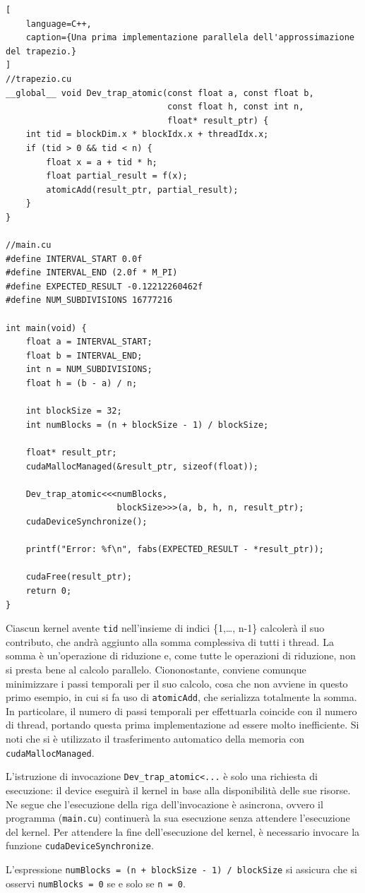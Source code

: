\begin{lstlisting}[
    language=C++, 
    caption={Una prima implementazione parallela dell'approssimazione del trapezio.}
]
//trapezio.cu
__global__ void Dev_trap_atomic(const float a, const float b, 
                                const float h, const int n, 
                                float* result_ptr) {
    int tid = blockDim.x * blockIdx.x + threadIdx.x;
    if (tid > 0 && tid < n) {
        float x = a + tid * h;
        float partial_result = f(x);
        atomicAdd(result_ptr, partial_result); 
    }
}

//main.cu
#define INTERVAL_START 0.0f
#define INTERVAL_END (2.0f * M_PI)
#define EXPECTED_RESULT -0.12212260462f
#define NUM_SUBDIVISIONS 16777216

int main(void) {
    float a = INTERVAL_START;
    float b = INTERVAL_END;
    int n = NUM_SUBDIVISIONS;
    float h = (b - a) / n;

    int blockSize = 32;
    int numBlocks = (n + blockSize - 1) / blockSize;
    
    float* result_ptr;
    cudaMallocManaged(&result_ptr, sizeof(float));

    Dev_trap_atomic<<<numBlocks, 
                      blockSize>>>(a, b, h, n, result_ptr);
    cudaDeviceSynchronize();

    printf("Error: %f\n", fabs(EXPECTED_RESULT - *result_ptr));
    
    cudaFree(result_ptr);
    return 0;
}
\end{lstlisting}
Ciascun kernel avente \texttt{tid} nell'insieme di indici \{1,\ldots, n-1\} calcolerà il suo contributo, che andrà aggiunto alla somma complessiva di tutti i thread.
La somma è un'operazione di riduzione e, come tutte le operazioni di riduzione, non si presta bene al calcolo parallelo.
Ciononostante, conviene comunque minimizzare i passi temporali per il suo calcolo, cosa che non avviene in questo primo esempio, in cui si fa uso di \texttt{atomicAdd}, che serializza totalmente la somma.
In particolare, il numero di passi temporali per effettuarla coincide con il numero di thread, portando questa prima implementazione ad essere molto inefficiente.
Si noti che si è utilizzato il trasferimento automatico della memoria con \texttt{cudaMallocManaged}.

\begin{note}{}
    L'istruzione di invocazione \texttt{Dev\_trap\_atomic<...} è solo una richiesta di esecuzione: il device eseguirà il kernel in base alla disponibilità delle sue risorse.
    Ne segue che l'esecuzione della riga dell'invocazione è asincrona, ovvero il programma (\texttt{main.cu}) continuerà la sua esecuzione senza attendere l'esecuzione del kernel.
    Per attendere la fine dell'esecuzione del kernel, è necessario invocare la funzione \texttt{cudaDeviceSynchronize}. 
\end{note}
L'espressione \texttt{numBlocks = (n + blockSize - 1) / blockSize} si assicura che si osservi \texttt{numBlocks = 0} se e solo se \texttt{n = 0}.

